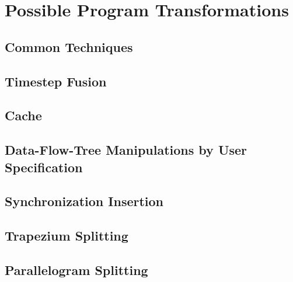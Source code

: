 \documentclass[twocolumn]{article}
\begin{document}
\section{Possible Program Transformations}
\subsection{Common Techniques}
\subsection{Timestep Fusion}
\subsection{Cache}
\subsection{Data-Flow-Tree Manipulations by User Specification}
\subsection{Synchronization Insertion}
\subsection{Trapezium Splitting}
\subsection{Parallelogram Splitting}




\end{document}

